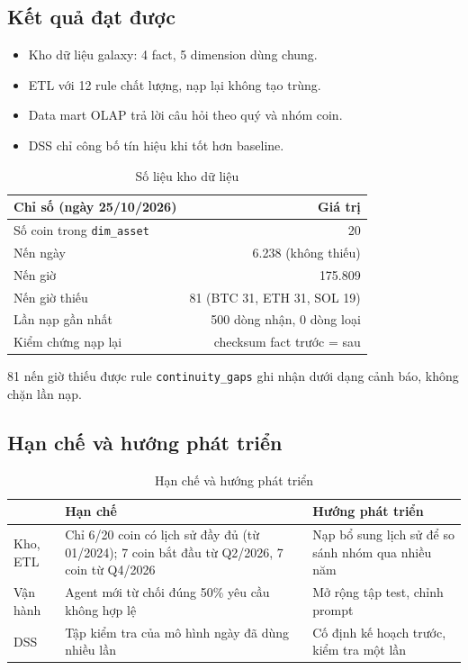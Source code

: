\documentclass[11pt,a4paper]{article}
\newcommand{\code}[1]{\texttt{#1}}
\begin{document}
\subsection{Kết quả đạt được}
\begin{itemize}
  \item Kho dữ liệu galaxy: 4 fact, 5 dimension dùng chung.
  \item ETL với 12 rule chất lượng, nạp lại không tạo trùng.
  \item Data mart OLAP trả lời câu hỏi theo quý và nhóm coin.
  \item DSS chỉ công bố tín hiệu khi tốt hơn baseline.
\end{itemize}
\begin{table}[H]
\centering\small
\begin{tabular}{lr}
\toprule
\textbf{Chỉ số (ngày 25/10/2026)} & \textbf{Giá trị} \\
\midrule
Số coin trong \code{dim\_asset} & 20 \\
Nến ngày & 6.238 (không thiếu) \\
Nến giờ & 175.809 \\
Nến giờ thiếu & 81 (BTC 31, ETH 31, SOL 19) \\
Lần nạp gần nhất & 500 dòng nhận, 0 dòng loại \\
Kiểm chứng nạp lại & checksum fact trước = sau \\
\bottomrule
\end{tabular}
\caption{Số liệu kho dữ liệu}
\end{table}

81 nến giờ thiếu được rule \code{continuity\_gaps} ghi nhận dưới dạng cảnh báo, không chặn lần nạp.

\subsection{Hạn chế và hướng phát triển}
\begin{table}[H]
\centering\small
\begin{tabularx}{\linewidth}{lXX}
\toprule
& \textbf{Hạn chế} & \textbf{Hướng phát triển} \\
\midrule
Kho, ETL & Chỉ 6/20 coin có lịch sử đầy đủ (từ 01/2024); 7 coin bắt đầu từ Q2/2026, 7 coin từ Q4/2026 & Nạp bổ sung lịch sử để so sánh nhóm qua nhiều năm \\
Vận hành & Agent mới từ chối đúng 50\% yêu cầu không hợp lệ & Mở rộng tập test, chỉnh prompt \\
DSS & Tập kiểm tra của mô hình ngày đã dùng nhiều lần & Cố định kế hoạch trước, kiểm tra một lần \\
\bottomrule
\end{tabularx}
\caption{Hạn chế và hướng phát triển}
\end{table}
\end{document}
